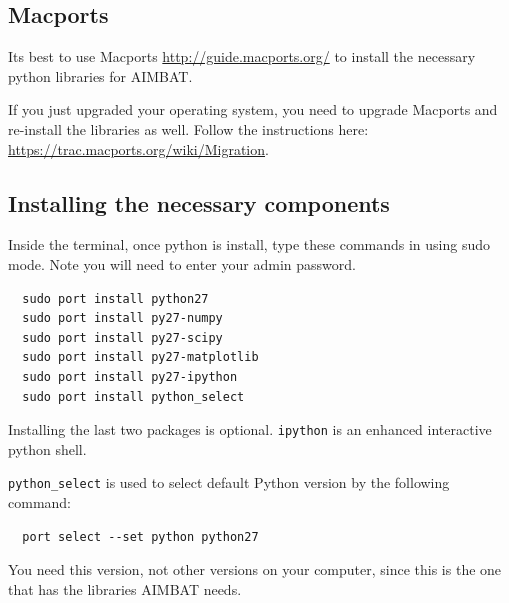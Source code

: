 \documentclass[letterpaper,10pt]{article}
\begin{document}

\subsection{Macports}

Its best to use Macports \url{http://guide.macports.org/} to install the necessary python libraries for AIMBAT. 

If you just upgraded your operating system, you need to upgrade Macports and re-install the libraries as well. Follow the instructions here: \url{https://trac.macports.org/wiki/Migration}.


\subsection{Installing the necessary components}

Inside the terminal, once python is install, type these commands in using sudo mode. Note you will need to enter your admin password.

\begin{verbatim}
  sudo port install python27
  sudo port install py27-numpy
  sudo port install py27-scipy
  sudo port install py27-matplotlib
  sudo port install py27-ipython
  sudo port install python_select
\end{verbatim}

Installing the last two packages is optional. \verb"ipython" is an enhanced interactive python shell.

\verb"python_select" is used to select default Python version by the following command:

\begin{verbatim}
  port select --set python python27
\end{verbatim}

You need this version, not other versions on your computer, since this is the one that has the libraries AIMBAT needs.


\end{document}
